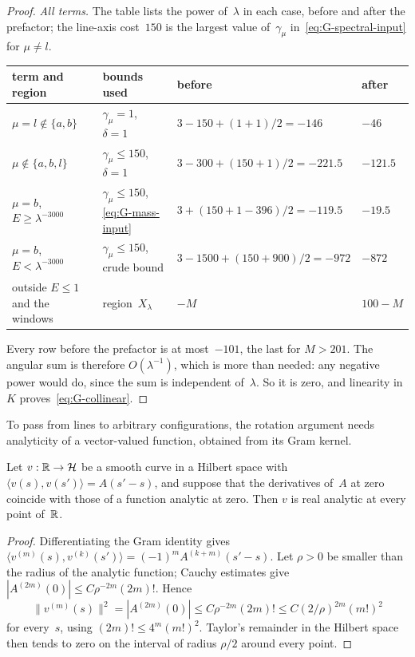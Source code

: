 \begin{proof}
\emph{All terms.} The table lists the power of~$\lambda$ in each case, before and after the prefactor; the line-axis cost~$150$ is the largest value of~$\gamma_\mu$ in~\eqref{eq:G-spectral-input} for $\mu\ne l$.
\begin{center}
\small
{\small\setlength{\tabcolsep}{4pt}
\begin{tabular}{llll}
\toprule
term and region & bounds used & before & after\\
\midrule
$\mu=l\notin\{a,b\}$ & $\gamma_\mu=1$, $\delta=1$ & $3-150+(1+1)/2=-146$ & $-46$\\
$\mu\notin\{a,b,l\}$ & $\gamma_\mu\le150$, $\delta=1$ & $3-300+(150+1)/2=-221.5$ & $-121.5$\\
$\mu=b$, $E\ge\lambda^{-3000}$ & $\gamma_\mu\le150$, \eqref{eq:G-mass-input} & $3+(150+1-396)/2=-119.5$ & $-19.5$\\
$\mu=b$, $E<\lambda^{-3000}$ & $\gamma_\mu\le150$, crude bound & $3-1500+(150+900)/2=-972$ & $-872$\\
outside $E\le1$ and the windows & region~$X_\lambda$ & $-M$ & $100-M$\\
\bottomrule
\end{tabular}}
\end{center}
Every row before the prefactor is at most~$-101$, the last for $M>201$. The angular sum is therefore $O(\lambda^{-1})$, which is more than needed: any negative power would do, since the sum is independent of~$\lambda$. So it is zero, and linearity in~$K$ proves~\eqref{eq:G-collinear}.
\end{proof}

To pass from lines to arbitrary configurations, the rotation argument needs analyticity of a vector-valued function, obtained from its Gram kernel.
\begin{lemma}\label{lem:G-analytic}
Let $v:\mathbb{R}\to\mathcal H$ be a smooth curve in a Hilbert space with $\langle v(s),v(s')\rangle=A(s'-s)$, and suppose that the derivatives of~$A$ at zero coincide with those of a function analytic at zero. Then $v$ is real analytic at every point of~$\mathbb{R}$.
\end{lemma}
\begin{proof}
Differentiating the Gram identity gives $\langle v^{(m)}(s),v^{(k)}(s')\rangle=(-1)^mA^{(k+m)}(s'-s)$. Let $\rho>0$ be smaller than the radius of the analytic function; Cauchy estimates give $|A^{(2m)}(0)|\le C\rho^{-2m}(2m)!$. Hence
\begin{equation*}
\|v^{(m)}(s)\|^2=|A^{(2m)}(0)|\le C\rho^{-2m}(2m)!\le C(2/\rho)^{2m}(m!)^2
\end{equation*}
for every~$s$, using $(2m)!\le4^m(m!)^2$. Taylor's remainder in the Hilbert space then tends to zero on the interval of radius $\rho/2$ around every point.
\end{proof}


